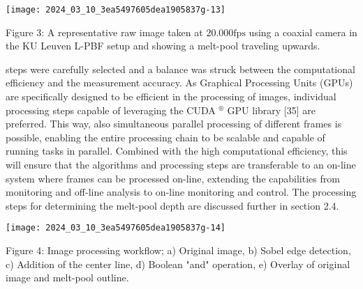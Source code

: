 \documentclass[10pt]{article}
\begin{document}
\begin{center}
\texttt{[image: 2024\_03\_10\_3ea5497605dea1905837g-13]}
\end{center}

Figure 3: A representative raw image taken at $20.000 \mathrm{fps}$ using a coaxial camera in the KU Leuven L-PBF setup and showing a melt-pool traveling upwards.

steps were carefully selected and a balance was struck between the computational efficiency and the measurement accuracy. As Graphical Processing Units (GPUs) are specifically designed to be efficient in the processing of images, individual processing steps capable of leveraging the CUDA ${ }^{\circledR}$ GPU library [35] are preferred. This way, also simultaneous parallel processing of different frames is possible, enabling the entire processing chain to be scalable and capable of running tasks in parallel. Combined with the high computational efficiency, this will ensure that the algorithms and processing steps are transferable to an on-line system where frames can be processed on-line, extending the capabilities from monitoring and off-line analysis to on-line monitoring and control. The processing steps for determining the melt-pool depth are discussed further in section 2.4.

\begin{center}
\texttt{[image: 2024\_03\_10\_3ea5497605dea1905837g-14]}
\end{center}

Figure 4: Image processing workflow; a) Original image, b) Sobel edge detection, c) Addition of the center line, d) Boolean "and" operation, e) Overlay of original image and melt-pool outline.
\end{document}
